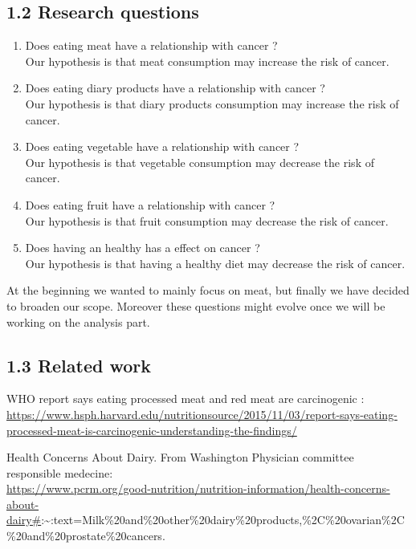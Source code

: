 \documentclass[
]{article}
\begin{document}
\hypertarget{research-questions}{%
\subsection{1.2 Research questions}\label{research-questions}}

\begin{enumerate}
\def\labelenumi{\arabic{enumi})}
\item
  Does eating meat have a relationship with cancer ?\\
  Our hypothesis is that meat consumption may increase the risk of
  cancer.
\item
  Does eating diary products have a relationship with cancer ?\\
  Our hypothesis is that diary products consumption may increase the
  risk of cancer.
\item
  Does eating vegetable have a relationship with cancer ?\\
  Our hypothesis is that vegetable consumption may decrease the risk of
  cancer.
\item
  Does eating fruit have a relationship with cancer ?\\
  Our hypothesis is that fruit consumption may decrease the risk of
  cancer.
\item
  Does having an healthy has a effect on cancer ?\\
  Our hypothesis is that having a healthy diet may decrease the risk of
  cancer.
\end{enumerate}

At the beginning we wanted to mainly focus on meat, but finally we have
decided to broaden our scope. Moreover these questions might evolve once
we will be working on the analysis part.

\hypertarget{related-work}{%
\subsection{1.3 Related work}\label{related-work}}

WHO report says eating processed meat and red meat are carcinogenic :
\url{https://www.hsph.harvard.edu/nutritionsource/2015/11/03/report-says-eating-processed-meat-is-carcinogenic-understanding-the-findings/}

Health Concerns About Dairy. From Washington Physician committee
responsible medecine:\\
\url{https://www.pcrm.org/good-nutrition/nutrition-information/health-concerns-about-dairy\#}:\textasciitilde:text=Milk\%20and\%20other\%20dairy\%20products,\%2C\%20ovarian\%2C\%20and\%20prostate\%20cancers.
\end{document}
